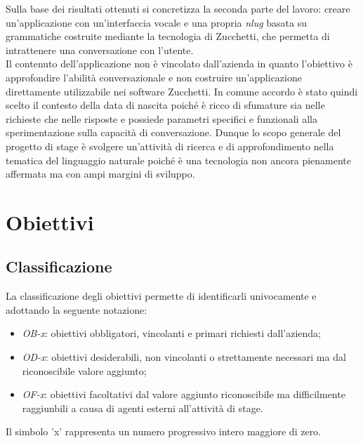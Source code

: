 Sulla base dei risultati ottenuti si concretizza la seconda parte del lavoro: creare un'applicazione con un'interfaccia vocale e una propria \emph{\gls{nlug}} basata su grammatiche costruite mediante la tecnologia di Zucchetti, che permetta di intrattenere una conversazione con l'utente. \\
Il contenuto dell'applicazione non è vincolato dall'azienda in quanto l'obiettivo è approfondire l'abilità conversazionale e non costruire un'applicazione direttamente utilizzabile nei software Zucchetti. In comune accordo è stato quindi scelto il contesto della data di nascita poiché è ricco di sfumature sia nelle richieste che nelle risposte e possiede parametri specifici e funzionali alla sperimentazione sulla capacità di conversazione.
Dunque lo scopo generale del progetto di stage è svolgere un'attività di ricerca e di approfondimento nella tematica del linguaggio naturale poiché è una tecnologia non ancora pienamente affermata ma con ampi margini di sviluppo.

\section{Obiettivi}
	\subsection{Classificazione}
	La classificazione degli obiettivi permette di identificarli univocamente e adottando la seguente notazione:
	\begin{itemize}
		\item \textit{OB-x}: obiettivi obbligatori, vincolanti e primari richiesti dall'azienda;
		\item \textit{OD-x}: obiettivi desiderabili, non vincolanti o strettamente necessari ma dal riconoscibile valore aggiunto;
		\item \textit{OF-x}: obiettivi facoltativi dal valore aggiunto riconoscibile ma difficilmente raggiunbili a causa di agenti esterni all'attività di stage.
	\end{itemize}
	Il simbolo 'x' rappresenta un numero progressivo intero maggiore di zero.
	
